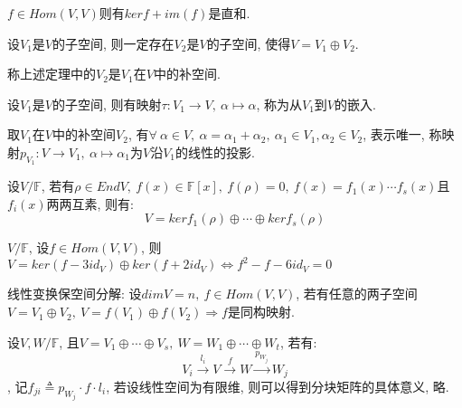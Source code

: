 \begin{example}
    $f\in Hom(V,V)$则有$kerf+im(f)$是直和.
\end{example}

\begin{theorem}
    设$V_1$是$V$的子空间, 则一定存在$V_2$是$V$的子空间, 使得$V=V_1\oplus V_2$.
\end{theorem}

\begin{definition}[补空间]
    称上述定理中的$V_2$是$V_1$在$V$中的补空间.
\end{definition}

\begin{definition}[嵌入]
    设$V_1$是$V$的子空间, 则有映射$\tau: V_1 \to V, \ \alpha \mapsto \alpha$, 称为从$V_1$到$V$的嵌入.
\end{definition}

\begin{definition}[线性投影]
    取$V_1$在$V$中的补空间$V_2$, 有$\forall \ \alpha \in V, \ \alpha=\alpha{_1}+\alpha{_2}, \ \alpha{_1}\in V_1, \alpha{_2}\in V_2$, 表示唯一, 称映射$p_{V_1}: V\to V_1, \ \alpha \mapsto \alpha{_1}$为$V$沿$V_1$的线性的投影.
\end{definition}

\begin{theorem}[准素分解定理]
    设$V/\mathbb{F}$, 若有$\rho \in EndV, \ f(x)\in\mathbb{F}[x], \ f(\rho)=0, \ f(x)=f_1(x)\cdots f_s(x)$且$f_i(x)$两两互素, 则有:
    \[V=kerf_1(\rho)\oplus\cdots\oplus kerf_s(\rho)\]
\end{theorem}

\begin{example}
    $V/\mathbb{F}$, 设$f\in Hom(V,V)$, 则$V=ker(f-3id_V)\oplus ker(f+2id_V)\Longleftrightarrow f^2-f-6id_V=0$
\end{example}

\begin{example}
    线性变换保空间分解: 设$dimV=n, \ f\in Hom(V, V)$, 若有任意的两子空间$V=V_1\oplus V_2,\ V=f(V_1)\oplus f(V_2)\Longrightarrow f$是同构映射.
\end{example}

\begin{example}
    设$V,W/\mathbb{F}$, 且$V=V_1\oplus\cdots\oplus V_s, \ W=W_1\oplus\cdots\oplus W_t$, 若有:
    \[V_i\stackrel{l_i}{\to}V\stackrel{f}{\to}W\stackrel{p_{W_j}}{\to}W_j\],
    记$f_{ji}\triangleq p_{W_j}\cdot f \cdot l_i$, 若设线性空间为有限维, 则可以得到分块矩阵的具体意义, 略.
\end{example}
